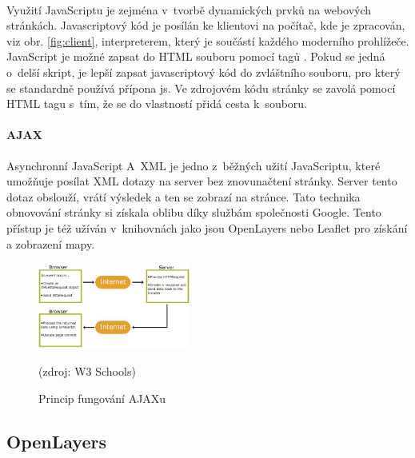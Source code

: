 \documentclass[11pt,a4paper,titlepage,oneside]{book}
\begin{document}


		\paragraph{} Využití JavaScriptu je zejména v~tvorbě dynamických prvků na webových stránkách. Javascriptový kód je posílán ke klientovi na počítač, kde je zpracován, viz obr. \ref{fig:client}, interpreterem, který je součástí každého moderního prohlížeče. JavaScript je možné zapsat do \ac{HTML} souboru pomocí tagů . Pokud se jedná o~delší skript, je lepší zapsat javascriptový kód do zvláštního souboru, pro který se standardně používá přípona js. Ve zdrojovém kódu stránky se zavolá pomocí \ac{HTML} tagu  s~tím, že se do vlastností přidá cesta k~souboru.
		\paragraph{AJAX} Asynchronní JavaScript A~XML je jedno z~běžných užití Java\-Scriptu, které umožňuje posílat \ac{XML} dotazy na server bez znovunačtení stránky. Server tento dotaz obslouží, vrátí výsledek a ten se zobrazí na stránce. Tato technika obnovování stránky si získala oblibu díky službám společnosti Google. Tento přístup je též užíván v~knihovnách jako jsou OpenLayers nebo Leaflet pro získání a zobrazení mapy.

		\begin{figure}[!h]
			\begin{center}
				\includegraphics[width=5cm]{obrazky/ajax.png}
				\caption{Princip fungování AJAXu}
				\label{fig:ajax}
				(zdroj: W3 Schools\cite{w3school})
			\end{center}
		\end{figure}	

		\subsection{OpenLayers} %
\end{document}
